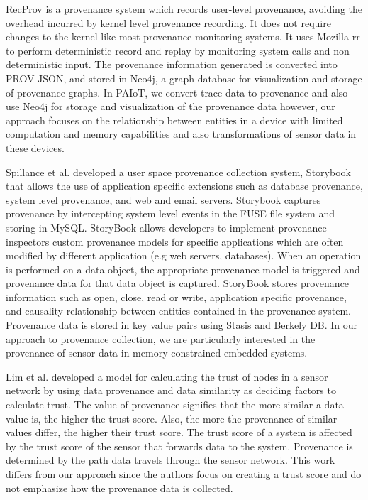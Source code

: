 \documentclass[conference]{IEEEtran}
\begin{document}
\par RecProv \cite{rec_prov} is a provenance system which records user-level provenance, avoiding the overhead incurred by kernel level provenance recording. It does not require changes to the kernel like most provenance monitoring systems. It uses Mozilla rr to perform deterministic record and replay by monitoring system calls  and non deterministic input. The provenance information generated is converted into PROV-JSON, and stored in Neo4j, a graph database for visualization and storage of provenance graphs. In PAIoT, we convert trace data to provenance and also use Neo4j for storage and visualization of the provenance data however, our approach focuses on the relationship between entities in a device with limited computation and memory capabilities and also transformations of sensor data in these devices.



\par Spillance et al. \cite{story} developed a user space provenance collection system, Storybook that allows the use of application specific extensions such as database provenance, system level provenance, and web and email servers. Storybook captures provenance by intercepting system level events in the FUSE file system and storing in MySQL. StoryBook allows developers to implement provenance inspectors custom provenance models for specific applications which are often modified by different application (e.g web servers, databases). When an operation is performed on a data object, the appropriate provenance model is triggered and provenance data for that data object is captured. StoryBook stores provenance information such as open, close, read or write, application specific provenance, and causality relationship between entities contained in the provenance system. Provenance data is stored in key value pairs using Stasis and Berkely DB.  In our approach to provenance collection, we are particularly interested in the provenance of sensor data in memory constrained embedded systems.



\par Lim et al. \cite{lim} developed a
model for calculating the trust of nodes in a sensor network by using data
provenance and data similarity as deciding factors to calculate trust. The value of
provenance signifies that the more similar a data value is, the higher the trust score.
Also, the more the provenance of similar values differ, the higher their trust score. The trust score of a system is affected by the trust score of the sensor that forwards data to the system. Provenance is determined by the path data travels through the sensor network. This work differs from our approach since the authors focus on creating a trust score and do not emphasize
how the provenance data is collected. 
\end{document}

